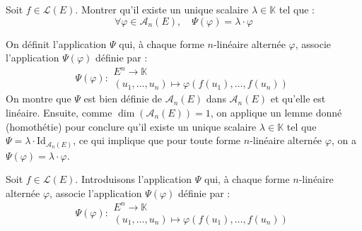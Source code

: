 \documentclass[11pt, a4paper]{article}
\theoremstyle{definition}
\begin{document}
\clearpage

\begin{tcolorbox}[instructionstyle]
	Soit $f \in \mathcal{L}(E)$. Montrer qu'il existe un unique scalaire $\lambda \in \mathbb{K}$ tel que :
	$$\forall \varphi \in \mathscr A_n(E), \quad \Psi(\varphi) = \lambda \cdot \varphi$$
\end{tcolorbox}

\begin{tcolorbox}[methodstyle]
	On définit l'application $\Psi$ qui, à chaque forme $n$-linéaire alternée $\varphi$, associe l'application $\Psi(\varphi)$ définie par :
	$$\Psi(\varphi) : \begin{matrix} E^n \to \mathbb{K} \\ (u_1, \dots, u_n) \mapsto \varphi(f(u_1), \dots, f(u_n)) \end{matrix}$$
	On montre que $\Psi$ est bien définie de $\mathscr{A}_n(E)$ dans $\mathscr{A}_n(E)$ et qu'elle est linéaire. Ensuite, comme $\dim(\mathscr{A}_n(E)) = 1$, on applique un lemme donné (homothétie) pour conclure qu'il existe un unique scalaire $\lambda \in \mathbb{K}$ tel que $\Psi = \lambda \cdot \mathrm{Id}_{\mathscr{A}_n(E)}$, ce qui implique que pour toute forme $n$-linéaire alternée $\varphi$, on a $\Psi(\varphi) = \lambda \cdot \varphi$.
\end{tcolorbox}

Soit $f \in \mathcal{L}(E)$. Introduisons l'application $\Psi$ qui, à chaque forme $n$-linéaire alternée $\varphi$, associe l'application $\Psi(\varphi)$ définie par :
$$\Psi(\varphi) : \begin{matrix} E^n \to \mathbb{K} \\ (u_1, \dots, u_n) \mapsto \varphi(f(u_1), \dots, f(u_n)) \end{matrix}$$
\end{document}
